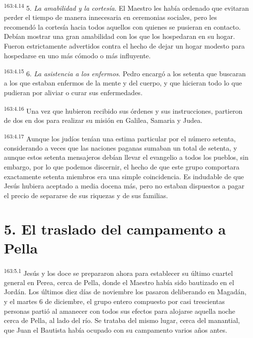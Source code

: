 \par
\textsuperscript{163:4.14} 5. \textit{La amabilidad y la cortesía}. El Maestro les había ordenado que evitaran perder el tiempo de manera innecesaria en ceremonias sociales, pero les recomendó la cortesía hacia todos aquellos con quienes se pusieran en contacto. Debían mostrar una gran amabilidad con los que los hospedaran en su hogar. Fueron estrictamente advertidos contra el hecho de dejar un hogar modesto para hospedarse en uno más cómodo o más influyente.

\par
\textsuperscript{163:4.15} 6. \textit{La asistencia a los enfermos}. Pedro encargó a los setenta que buscaran a los que estaban enfermos de la mente y del cuerpo, y que hicieran todo lo que pudieran por aliviar o curar sus enfermedades.

\par
\textsuperscript{163:4.16} Una vez que hubieron recibido sus órdenes y sus instrucciones, partieron de dos en dos para realizar su misión en Galilea, Samaria y Judea.

\par
\textsuperscript{163:4.17} Aunque los judíos tenían una estima particular por el número setenta, considerando a veces que las naciones paganas sumaban un total de setenta, y aunque estos setenta mensajeros debían llevar el evangelio a todos los pueblos, sin embargo, por lo que podemos discernir, el hecho de que este grupo comportara exactamente setenta miembros era una simple coincidencia. Es indudable de que Jesús hubiera aceptado a media docena más, pero no estaban dispuestos a pagar el precio de separarse de sus riquezas y de sus familias.

\section*{5. El traslado del campamento a Pella}
\par
\textsuperscript{163:5.1} Jesús y los doce se prepararon ahora para establecer su último cuartel general en Perea, cerca de Pella, donde el Maestro había sido bautizado en el Jordán. Los últimos diez días de noviembre los pasaron deliberando en Magadán, y el martes 6 de diciembre, el grupo entero compuesto por casi trescientas personas partió al amanecer con todos sus efectos para alojarse aquella noche cerca de Pella, al lado del río. Se trataba del mismo lugar, cerca del manantial, que Juan el Bautista había ocupado con su campamento varios años antes.

